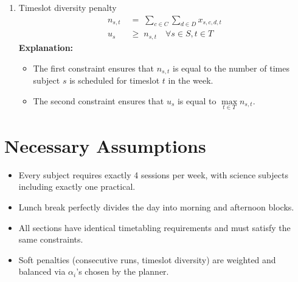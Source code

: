 \documentclass[11pt]{article}
\begin{document}
\begin{enumerate}
      \item Timeslot diversity penalty
      \begin{align*}
        n_{s,t} &\;=\; \sum_{c\in C}\sum_{d\in D} x_{s,c,d,t}\\
        u_s &\;\geq\; n_{s,t} \quad \forall s \in S, t \in T
      \end{align*}
      \textbf{Explanation:}
      \begin{itemize}
        \item The first constraint ensures that \(n_{s,t}\) is equal to the number of times subject \(s\) is scheduled for timeslot \(t\) in the week.
        \item The second constraint ensures that \(u_s\) is equal to \(\max\limits_{t \in T}n_{s,t}\).
      \end{itemize}
      
\end{enumerate}
\section*{Necessary Assumptions}
\begin{itemize}
    \item Every subject requires exactly 4 sessions per week, with science subjects including exactly one practical.
    \item Lunch break perfectly divides the day into morning and afternoon blocks.
    \item All sections have identical timetabling requirements and must satisfy the same constraints.
    \item Soft penalties (consecutive runs, timeslot diversity) are weighted and balanced via \(\alpha_i\)'s chosen by the planner.
\end{itemize}
\end{document}
